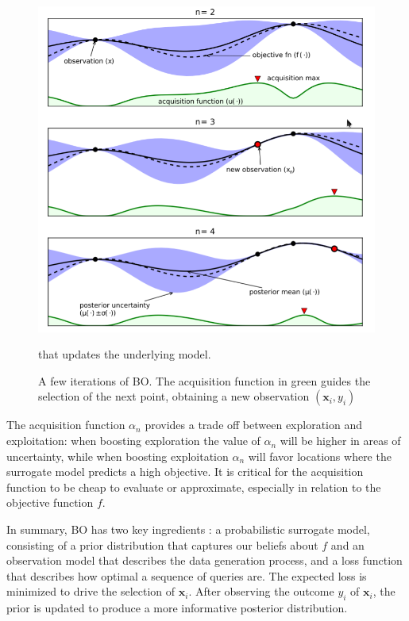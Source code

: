 \documentclass[a4paper, 12pt]{article} %
\begin{document}
	\begin{figure} \label{fig:bo}
		\includegraphics[width=\linewidth]{img/bo.png}
		\caption{A few iterations of BO. The acquisition function in green guides the selection of the next point, obtaining a new observation $(\pmb{x}_i, y_i)$} that updates the underlying model.
	\end{figure}
	The acquisition function $\alpha_n$ provides a trade off between exploration and exploitation: when boosting exploration the value of $\alpha_n$ will be higher in areas of uncertainty, while when boosting exploitation $\alpha_n$ will favor locations where the surrogate model predicts a high objective. It is critical for the acquisition function to be cheap to evaluate or approximate, especially in relation to the objective function $f$.
	
	In summary, BO has two key ingredients \cite{BO}: a probabilistic surrogate model, consisting of a prior distribution that captures our beliefs about $f$ and an observation model that describes the data generation process, and a loss function that describes how optimal a sequence of queries are. The expected loss is minimized to drive the selection of $\pmb{x}_i$. After observing the outcome $y_i$ of $\pmb{x}_i$, the prior is updated to produce a more informative posterior distribution.
	
\end{document}
